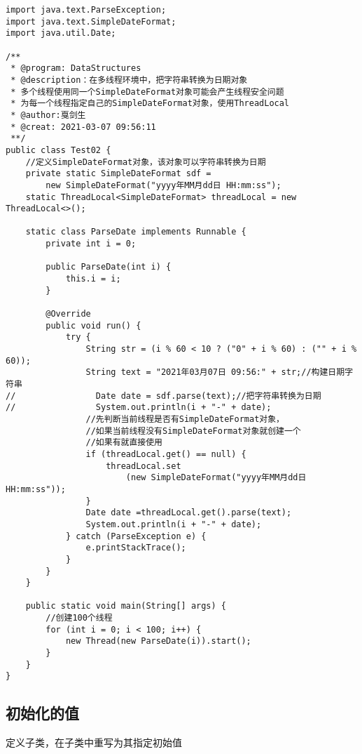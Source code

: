 \documentclass[a4paper]{report}
\begin{document}
\begin{Verbatim}[frame=single,numbersep=5pt,xleftmargin=1.5em,xrightmargin=1.5em]
import java.text.ParseException;
import java.text.SimpleDateFormat;
import java.util.Date;

/**
 * @program: DataStructures
 * @description：在多线程环境中，把字符串转换为日期对象 
 * 多个线程使用同一个SimpleDateFormat对象可能会产生线程安全问题
 * 为每一个线程指定自己的SimpleDateFormat对象，使用ThreadLocal
 * @author:戛剑生
 * @creat: 2021-03-07 09:56:11
 **/
public class Test02 {
    //定义SimpleDateFormat对象，该对象可以字符串转换为日期
    private static SimpleDateFormat sdf = 
        new SimpleDateFormat("yyyy年MM月dd日 HH:mm:ss");
    static ThreadLocal<SimpleDateFormat> threadLocal = new ThreadLocal<>();

    static class ParseDate implements Runnable {
        private int i = 0;

        public ParseDate(int i) {
            this.i = i;
        }

        @Override
        public void run() {
            try {
                String str = (i % 60 < 10 ? ("0" + i % 60) : ("" + i % 60));
                String text = "2021年03月07日 09:56:" + str;//构建日期字符串
//                Date date = sdf.parse(text);//把字符串转换为日期
//                System.out.println(i + "-" + date);
                //先判断当前线程是否有SimpleDateFormat对象，
                //如果当前线程没有SimpleDateFormat对象就创建一个
                //如果有就直接使用
                if (threadLocal.get() == null) {
                    threadLocal.set
                        (new SimpleDateFormat("yyyy年MM月dd日 HH:mm:ss"));
                }
                Date date =threadLocal.get().parse(text);
                System.out.println(i + "-" + date);
            } catch (ParseException e) {
                e.printStackTrace();
            }
        }
    }

    public static void main(String[] args) {
        //创建100个线程
        for (int i = 0; i < 100; i++) {
            new Thread(new ParseDate(i)).start();
        }
    }
}
\end{Verbatim}
\subsection{初始化的值}
定义子类，在子类中重写为其指定初始值
\end{document}
